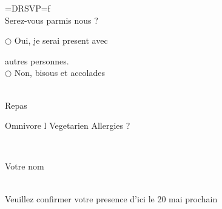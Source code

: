 \documentclass{letter}
\newcommand{\dotrule}[1]{%
   \parbox[t]{#1}{\hrulefill}}
\begin{document}
\centering
{\centering \carolyna\fontsize{48}{50}\selectfont =DRSVP=f}\\
\vspace{5mm}
{\imfell \large Serez-vous parmis nous ? }\\
\vspace{2.5mm}
{\imfell $\bigcirc$ Oui, je serai present avec \dotrule{10mm} autres personnes.\\
$\bigcirc$ Non, bisous et accolades} \\
\vspace{7.5mm}
{\imfell \large Repas}\\
\vspace{2.5mm}
{ Omnivore \hspace{5mm} {\vege l} Vegetarien \hspace{5mm} Allergies ?  \dotrule{20mm}} \\
\vspace{9.5mm}
{\imfell Votre nom \dotrule{50mm}}\\
\vspace{\fill}
{\centering \imfell Veuillez confirmer votre presence d'ici le 20 mai prochain} \\
\end{document}
